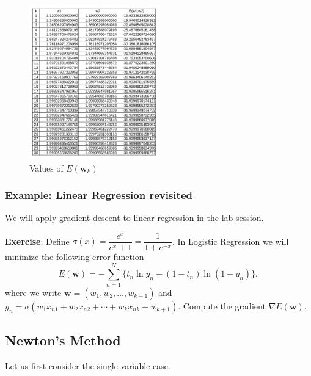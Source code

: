 \documentclass[
]{article}
\begin{document}
\begin{figure}
\hypertarget{fig:tab}{%
\centering
\includegraphics[width=0.5\textwidth,height=\textheight]{table.png}
\caption{Values of \(E({\boldsymbol{w}}_k)\)}\label{fig:tab}
}
\end{figure}

\hypertarget{example-linear-regression-revisited}{%
\subsubsection{Example: Linear Regression
revisited}\label{example-linear-regression-revisited}}

We will apply gradient descent to linear regression in the lab session.

\textbf{Exercise}: Define
\(\sigma(x) = \dfrac {e^x}{e^x+1}= \dfrac 1 {1+e^{-x}}\). In Logistic
Regression we will minimize the following error function
\[ E ({\boldsymbol{w}}) = - \sum_{n=1}^N \{ t_n \ln y_n + (1-t_n) \ln (1-y_n)\},  \]
where we write \({\boldsymbol{w}}=(w_1, w_2, \dots , w_{k+1})\) and
\(y_n=\sigma(w_1 x_{n1}+ w_2 x_{n2} + \cdots + w_k x_{nk}+w_{k+1} )\).
Compute the gradient \(\nabla E({\boldsymbol{w}})\).

\hypertarget{newtons-method}{%
\subsection{Newton's Method}\label{newtons-method}}

Let us first consider the single-variable case.
\end{document}

